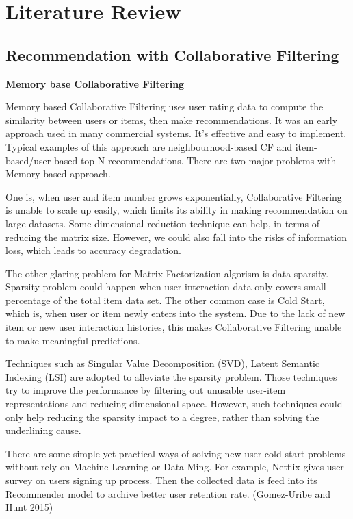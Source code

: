 \section{Literature Review}

\subsection{Recommendation with Collaborative Filtering}
\bigskip
\textbf{Memory base Collaborative Filtering}

Memory based Collaborative Filtering uses user rating data to compute the similarity between users or items, then make recommendations. It was an early approach used in many commercial systems. It's effective and easy to implement. Typical examples of this approach are neighbourhood-based CF and item-based/user-based top-N recommendations. There are two major problems with Memory based approach.  

One is, when user and item number grows exponentially, Collaborative Filtering is unable to scale up easily, which limits its ability in making recommendation on large datasets. Some dimensional reduction technique can help, in terms of reducing the matrix size. However, we could also fall into the risks of information loss, which leads to accuracy degradation.  

The other glaring problem for Matrix Factorization algorism is data sparsity. Sparsity problem could happen when user interaction data only covers small percentage of the total item data set. The other common case is Cold Start, which is, when user or item newly enters into the system. Due to the lack of new item or new user interaction histories, this makes Collaborative Filtering unable to make meaningful predictions.  

Techniques such as Singular Value Decomposition (SVD), Latent Semantic Indexing (LSI) are adopted to alleviate the sparsity problem. Those techniques try to improve the performance by filtering out unusable user-item representations and reducing dimensional space. However, such techniques could only help reducing the sparsity impact to a degree, rather than solving the underlining cause. 

There are some simple yet practical ways of solving new user cold start problems without rely on Machine Learning or Data Ming. For example, Netflix gives user survey on users signing up process. Then the collected data is feed into its Recommender model to archive better user retention rate. (Gomez-Uribe and Hunt 2015) 


